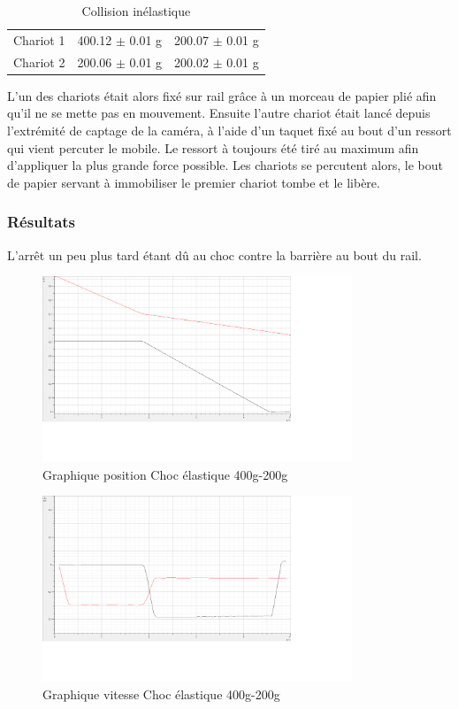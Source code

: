\begin{table}[h]
    \centering
    \caption{Collision inélastique}
    \begin{tabular}{|l|l|l|}
	\hline
	Chariot 1 & 400.12 $\pm$ 0.01 g & 200.07 $\pm$ 0.01 g \\
	Chariot 2 & 200.06 $\pm$ 0.01 g & 200.02 $\pm$ 0.01 g \\
	\hline
    \end{tabular}
\end{table}

L'un des chariots était alors fixé sur rail grâce à un morceau de papier plié afin qu'il ne se mette pas en mouvement. Ensuite l'autre chariot était lancé depuis l'extrémité de captage de la caméra, à l'aide d'un taquet fixé au bout d'un ressort qui vient percuter le mobile. Le ressort à toujours été tiré au maximum afin d'appliquer la plus grande force possible. Les chariots se percutent alors, le bout de papier servant à immobiliser le premier chariot tombe et le libère.

\subsubsection{Résultats}

L'arrêt un peu plus tard étant dû au choc contre la barrière au bout du rail.

\begin{figure}[h]
    \caption[Graphique position Choc élastique 400g-200g]{Graphique position Choc élastique 400g-200g}
    \centering
    \includegraphics[height=15em]{Data/400-200ela01.png}
\end{figure}

\begin{figure}[h]
    \caption[Graphique vitesse Choc élastique 400g-200g]{Graphique vitesse Choc élastique 400g-200g}
    \centering
    \includegraphics[height=15em]{Data/400-200ela02v.png}
\end{figure}


